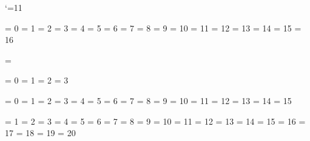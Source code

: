 \ifx\undefined\unprotect \catcode`\@=11 \fi 


\chardef\@@bottomlevelgroup   =  0
\chardef\@@simplegroup        =  1
\chardef\@@hboxgroup          =  2
\chardef\@@adjustedhboxgroup  =  3
\chardef\@@vboxgroup          =  4
\chardef\@@vtopgroup          =  5
\chardef\@@aligngroup         =  6
\chardef\@@noaligngroup       =  7
\chardef\@@outputgroup        =  8
\chardef\@@mathgroup          =  9
\chardef\@@discretionarygroup = 10
\chardef\@@insertgroup        = 11
\chardef\@@vcentergroup       = 12
\chardef\@@mathchoicegroup    = 13
\chardef\@@semisimplegroup    = 14
\chardef\@@mathshiftgroup     = 15
\chardef\@@mathleftgroup      = 16

\chardef\@@vadjustgroup       = \@@insertgroup


\chardef\@@batchmode     = 0
\chardef\@@nonstopmode   = 1
\chardef\@@scrollmode    = 2
\chardef\@@errorstopmode = 3


\chardef\@@charnode          =  0
\chardef\@@hlistnode         =  1
\chardef\@@vlistnode         =  2
\chardef\@@rulenode          =  3
\chardef\@@insertnode        =  4
\chardef\@@marknode          =  5
\chardef\@@adjustnode        =  6
\chardef\@@ligaturenode      =  7
\chardef\@@discretionarynode =  8
\chardef\@@whatsitnode       =  9
\chardef\@@mathnode          = 10
\chardef\@@gluenode          = 11
\chardef\@@kernnode          = 12
\chardef\@@penaltynode       = 13
\chardef\@@unsetnode         = 14
\chardef\@@mathsnode         = 15


\chardef\@@charif     =  1
\chardef\@@catif      =  2
\chardef\@@numif      =  3
\chardef\@@dimif      =  4
\chardef\@@oddif      =  5
\chardef\@@vmodeif    =  6
\chardef\@@hmodeif    =  7
\chardef\@@mmodeif    =  8
\chardef\@@innerif    =  9
\chardef\@@voidif     = 10
\chardef\@@hboxif     = 11
\chardef\@@vboxif     = 12
\chardef\@@xif        = 13
\chardef\@@eofif      = 14
\chardef\@@trueif     = 15
\chardef\@@falseif    = 16
\chardef\@@caseif     = 17
\chardef\@@definedif  = 18
\chardef\@@csnameif   = 19
\chardef\@@fontcharif = 20


